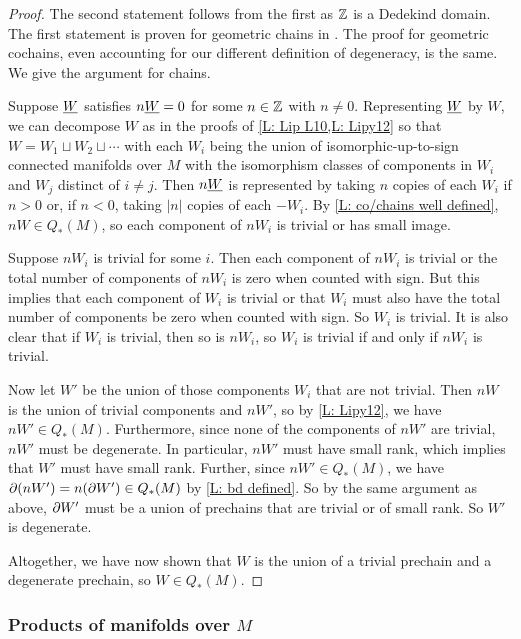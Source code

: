 \begin{proof}
	The second statement follows from the first as $\mathbb{Z}$ is a Dedekind domain.
	The first statement is proven for geometric chains in \cite[Lemma 34]{Lipy14}.
	The proof for geometric cochains, even accounting for our different definition of degeneracy, is the same.
	We give the argument for chains.

	Suppose $\underline{W}$ satisfies $n \underline{W} = 0$ for some $n \in \mathbb{Z}$ with $n \neq 0$.
	Representing $\underline{W}$ by $W$, we can decompose $W$ as in the proofs of \cref{L: Lip L10,L: Lipy12} so that $W = W_1 \sqcup W_2 \sqcup \cdots$ with each $W_i$ being the union of isomorphic-up-to-sign connected manifolds over $M$ with the isomorphism classes of components in $W_i$ and $W_j$ distinct of $i\neq j$.
	Then $n \underline{W}$ is represented by taking $n$ copies of each $W_i$ if $n > 0$ or, if $n < 0$, taking $|n|$ copies of each $-W_i$.
	By \cref{L: co/chains well defined}, $n W \in Q_*(M)$, so each component of $n W_i$ is trivial or has small image.

	Suppose $n W_i$ is trivial for some $i$.
 	Then each component of $n W_i$ is trivial or the total number of components of $n W_i$ is zero when counted with sign.
	But this implies that each component of $W_i$ is trivial or that $W_i$ must also have the total number of components be zero when counted with sign.
	So $W_i$ is trivial.
	It is also clear that if $W_i$ is trivial, then so is $n W_i$, so $W_i$ is trivial if and only if $n W_i$ is trivial.

	Now let $W'$ be the union of those components $W_i$ that are not trivial.
	Then $nW$ is the union of trivial components and $n W'$, so by \cref{L: Lipy12}, we have $n W' \in Q_*(M)$.
	Furthermore, since none of the components of $n W'$ are trivial, $n W'$ must be degenerate.
	In particular, $n W'$ must have small rank, which implies that $W'$ must have small rank.
	Further, since $n W' \in Q_*(M)$, we have $\partial (n W') = n (\partial W') \in Q_*(M)$ by \cref{L: bd defined}.
	So by the same argument as above, $\partial W'$ must be a union of prechains that are trivial or of small rank.
	So $W'$ is degenerate.

	Altogether, we have now shown that $W$ is the union of a trivial prechain and a degenerate prechain, so $W \in Q_*(M)$.
\end{proof}

\subsubsection{Products of manifolds over \texorpdfstring{$M$}{M}}

